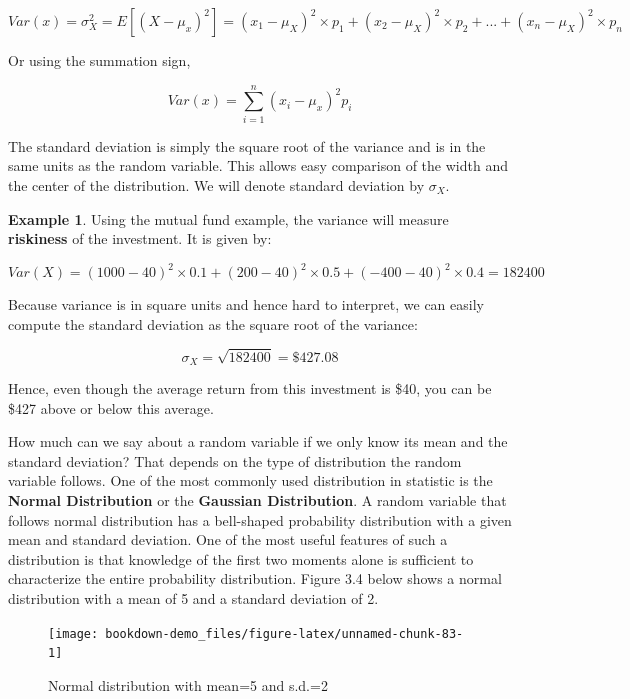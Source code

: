 \documentclass[
]{book}
\theoremstyle{definition}
\theoremstyle{definition}
\newtheorem{example}{Example}[chapter]
\theoremstyle{definition}
\theoremstyle{definition}
\theoremstyle{remark}
\begin{document}
\[Var(x)= \sigma^2_X=E[(X-\mu_x)^2]= (x_1-\mu_X)^2 \times p_1+(x_2-\mu_X)^2 \times p_2+...+ (x_n-\mu_X)^2 \times p_n\]

Or using the summation sign,

\[Var(x)=\sum_{i=1}^n (x_i-\mu_x)^2p_i\]

The standard deviation is simply the square root of the variance and is in the same units as the random variable. This allows easy comparison of the width and the center of the distribution. We will denote standard deviation by \(\sigma_X\).

\begin{example}
\protect\hypertarget{exm:unnamed-chunk-82}{}\label{exm:unnamed-chunk-82}Using the mutual fund example, the variance will measure \textbf{riskiness} of the investment. It is given by:

\[Var(X)=(1000-40)^2\times 0.1 + (200-40)^2 \times 0.5 + (-400-40)^2 \times 0.4=182400\]

Because variance is in square units and hence hard to interpret, we can easily compute the standard deviation as the square root of the variance:

\[\sigma_X=\sqrt{182400}=\$427.08\]

Hence, even though the average return from this investment is \$40, you can be \$427 above or below this average.
\end{example}

How much can we say about a random variable if we only know its mean and the standard deviation? That depends on the type of distribution the random variable follows. One of the most commonly used distribution in statistic is the \textbf{Normal Distribution} or the \textbf{Gaussian Distribution}. A random variable that follows normal distribution has a bell-shaped probability distribution with a given mean and standard deviation. One of the most useful features of such a distribution is that knowledge of the first two moments alone is sufficient to characterize the entire probability distribution. Figure 3.4 below shows a normal distribution with a mean of 5 and a standard deviation of 2.

\begin{figure}

{\centering \texttt{[image: bookdown-demo\_files/figure-latex/unnamed-chunk-83-1]} 

}

\caption{Normal distribution with mean=5 and s.d.=2}\label{fig:unnamed-chunk-83}
\end{figure}
\end{document}
